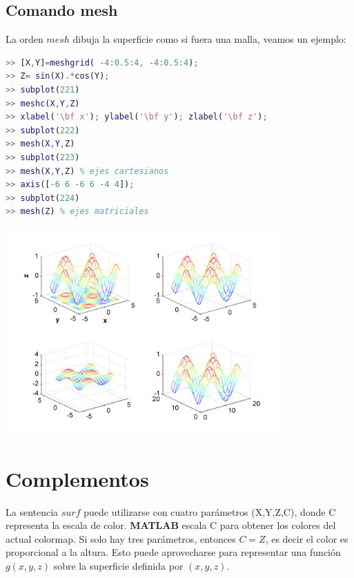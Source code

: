 \subsection{Comando mesh}

La orden $mesh$ dibuja la superficie como si fuera una malla, veamos un ejemplo:
\begin{lstlisting}[language=Matlab]
>> [X,Y]=meshgrid( -4:0.5:4, -4:0.5:4);
>> Z= sin(X).*cos(Y);
>> subplot(221)
>> meshc(X,Y,Z)
>> xlabel('\bf x'); ylabel('\bf y'); zlabel('\bf z');
>> subplot(222)
>> mesh(X,Y,Z)
>> subplot(223)
>> mesh(X,Y,Z) % ejes cartesianos
>> axis([-6 6 -6 6 -4 4]);
>> subplot(224)
>> mesh(Z) % ejes matriciales
\end{lstlisting}
\includegraphics[width=300pt]{./Imagenes/3d3.png}


\section{Complementos}

La sentencia $surf$ puede utilizarse con cuatro parámetros (X,Y,Z,C), donde C representa la escala de color. \textbf{MATLAB} escala C para obtener los colores del actual colormap. Si solo hay tres parámetros, entonces $C=Z$, es decir el color es proporcional a la altura. Esto puede aprovecharse para representar una función $g(x, y, z)$ sobre la superficie definida por $(x, y, z)$.

